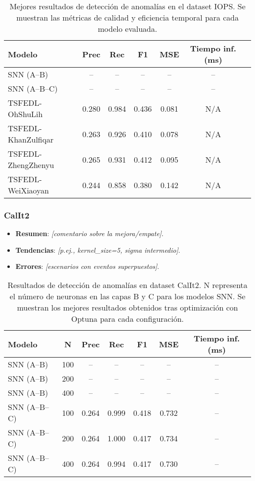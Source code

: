 \begin{table}[htbp]
\centering
\small
\begin{tabular}{lcccccc}
\hline\hline
\textbf{Modelo} & \textbf{Prec} & \textbf{Rec} & \textbf{F1} & \textbf{MSE} & \textbf{Tiempo inf. (ms)} \\
\hline
SNN (A--B) & -- & -- & -- & -- & -- \\
SNN (A--B--C) & -- & -- & -- & -- & -- \\
TSFEDL-OhShuLih & 0.280 & 0.984 & 0.436 & 0.081 & N/A \\
TSFEDL-KhanZulfiqar & 0.263 & 0.926 & 0.410 & 0.078 & N/A \\
TSFEDL-ZhengZhenyu & 0.265 & 0.931 & 0.412 & 0.095 & N/A \\
TSFEDL-WeiXiaoyan & 0.244 & 0.858 & 0.380 & 0.142 & N/A \\
\hline\hline
\end{tabular}
\caption{Mejores resultados de detección de anomalías en el dataset IOPS. Se muestran las métricas de calidad y eficiencia temporal para cada modelo evaluada.}
\label{tab:resultados-iops}
\end{table}

\subsubsection{CalIt2}
\begin{itemize}
    \item \textbf{Resumen}: \textit{[comentario sobre la mejora/empate]}.
    \item \textbf{Tendencias}: \textit{[p.ej., kernel\_size=5, sigma intermedio]}.
    \item \textbf{Errores}: \textit{[escenarios con eventos superpuestos]}.
\end{itemize}

\begin{table}[htbp]
\centering
\small
\begin{tabular}{lcccccc}
\hline\hline
\textbf{Modelo} & \textbf{N} & \textbf{Prec} & \textbf{Rec} & \textbf{F1} & \textbf{MSE} & \textbf{Tiempo inf. (ms)} \\
\hline
SNN (A--B) & 100 & -- & -- & -- & -- & -- \\
SNN (A--B) & 200 & -- & -- & -- & -- & -- \\
SNN (A--B) & 400 & -- & -- & -- & -- & -- \\
\hline
SNN (A--B--C) & 100 & 0.264 & 0.999 & 0.418 & 0.732 & -- \\
SNN (A--B--C) & 200 & 0.264 & 1.000 & 0.417 & 0.734 & -- \\
SNN (A--B--C) & 400 & 0.264 & 0.994 & 0.417 & 0.730 & -- \\
\hline\hline
\hline\hline
\end{tabular}
\caption{Resultados de detección de anomalías en dataset CalIt2. N representa el número de neuronas en las capas B y C para los modelos SNN. Se muestran los mejores resultados obtenidos tras optimización con Optuna para cada configuración.}
\label{tab:resultados-iops-escalabilidad}
\end{table}


